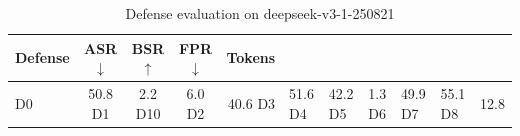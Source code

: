 \begin{table}[t]
\centering
\small
\begin{tabular}{l c c c r}
\toprule
Defense & ASR $\downarrow$ & BSR $\uparrow$ & FPR $\downarrow$ & Tokens \\
\midrule
D0 & 50.8%
D1 & 2.2%
D10 & 6.0%
D2 & 40.6%
D3 & 51.6%
D4 & 42.2%
D5 & 1.3%
D6 & 49.9%
D7 & 55.1%
D8 & 12.8%
\bottomrule
\end{tabular}
\caption{Defense evaluation on deepseek-v3-1-250821}
\label{tab:results_deepseek_v3_1_250821}
\end{table}